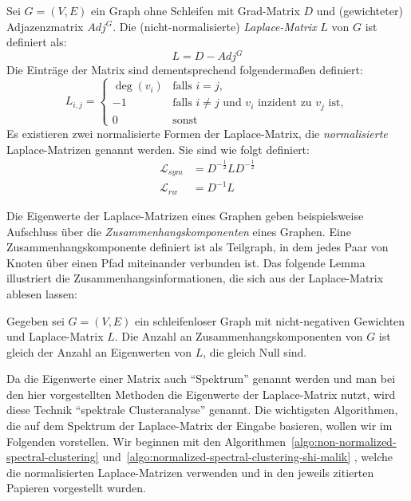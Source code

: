\begin{definition}
\label{def:laplace-matrix}
	Sei $G=(V,E)$ ein Graph ohne Schleifen mit Grad-Matrix $D$ und (gewichteter) Adjazenzmatrix $Adj^G$.
	Die (nicht-normalisierte) \emph{Laplace-Matrix} $L$ von $G$ ist definiert als:
	\[ L = D - Adj^G \]
	Die Einträge der Matrix sind dementsprechend folgendermaßen definiert:
	\[ L_{i,j} = 	\begin{cases}
						\deg(v_i) & \textrm{falls } i = j, \\
						-1 & \textrm{falls } i \neq j \textrm{ und $v_i$ inzident zu $v_j$ ist}, \\
						0 & \textrm{sonst}
					\end{cases}
	\]
	Es existieren zwei normalisierte Formen der Laplace-Matrix, die \emph{normalisierte} Laplace-Matrizen genannt werden.
	Sie sind wie folgt definiert:
	\begin{align*}
		\mathcal{L}_{sym} &= D^{-\frac{1}{2}} L D^{-\frac{1}{2}} \\
		\mathcal{L}_{rw} &= D^{-1} L
	\end{align*}
\end{definition}
Die Eigenwerte der Laplace-Matrizen eines Graphen geben beispielsweise Aufschluss über die \emph{Zusammenhangskomponenten} eines
Graphen. Eine Zusammenhangskomponente definiert ist als Teilgraph, in dem jedes Paar von Knoten über einen Pfad
miteinander verbunden ist. Das folgende Lemma illustriert die Zusammenhangsinformationen, die sich aus der Laplace-Matrix
ablesen lassen:

\begin{lemma}
\label{lemma:connectivity-laplace-spectrum}
	Gegeben sei $G=(V,E)$ ein schleifenloser Graph mit nicht-negativen Gewichten und Laplace-Matrix $L$. Die Anzahl an
	Zusammenhangskomponenten von $G$ ist gleich der Anzahl an Eigenwerten von $L$, die gleich Null sind.
\end{lemma}
Da die Eigenwerte einer Matrix auch "`Spektrum"' genannt werden und man bei den hier vorgestellten Methoden die Eigenwerte
der Laplace-Matrix nutzt, wird diese Technik "`spektrale Clusteranalyse"' genannt.
\absatz
Die wichtigsten Algorithmen, die auf dem Spektrum der Laplace-Matrix der Eingabe basieren, wollen wir im Folgenden vorstellen.
Wir beginnen mit den Algorithmen~\ref{algo:non-normalized-spectral-clustering}
und~\ref{algo:normalized-spectral-clustering-shi-malik} , welche die normalisierten Laplace-Matrizen verwenden und
in den jeweils zitierten Papieren vorgestellt wurden.

